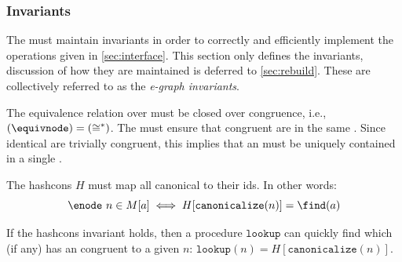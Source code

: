 \subsubsection{\Egraph Invariants}
\label{sec:invariants}

The \egraph must maintain invariants in order to
  correctly and efficiently implement the operations given in \autoref{sec:interface}.
This section only defines the invariants,
  discussion of how they are maintained is deferred to \autoref{sec:rebuild}.
These are collectively referred to as the \textit{e-graph invariants}.

\begin{definition}
  \label{def:cong-inv}
  The equivalence relation over \enodes must be closed over congruence,
    i.e., $(\equivnode) = (\cong^{*})$.
  The \egraph must ensure that congruent \enodes are in the same \eclass.
  Since identical \enodes are trivially congruent,
   this implies that an \enode must be uniquely contained in a single \eclass.
\end{definition}

\begin{definition}
  \label{def:hash-inv}
  The hashcons $H$ must map all canonical \enodes to their \eclass ids.
  In other words:
  $$ \enode\ n \in M[a] \iff H[\texttt{canonicalize}(n)] = \find(a) $$

  If the hashcons invariant holds, then a procedure $\texttt{lookup}$
    can quickly find which \eclass (if any) has an \enode congruent to a given \enode $n$:
  $\texttt{lookup}(n) = H[\texttt{canonicalize}(n)]$.
\end{definition}



